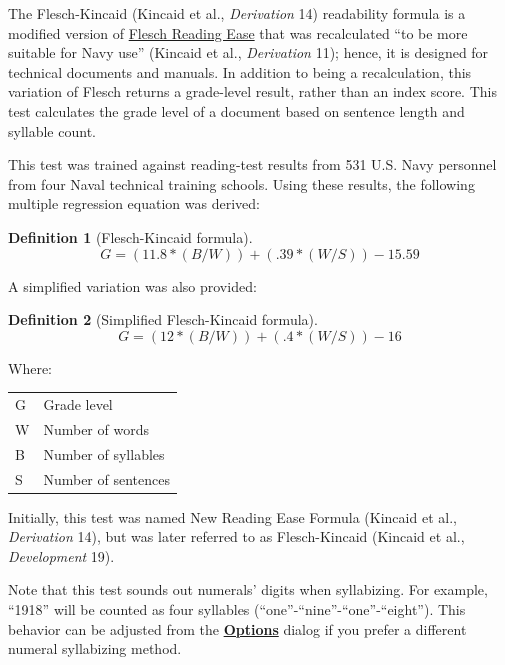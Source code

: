 \documentclass[
]{book}
\theoremstyle{definition}
\newtheorem{definition}{Definition}[chapter]
\theoremstyle{definition}
\theoremstyle{definition}
\theoremstyle{definition}
\theoremstyle{remark}
\begin{document}
The Flesch-Kincaid (Kincaid et al., \emph{Derivation} 14) readability formula is a modified version of \protect\hyperlink{flesch-test}{Flesch Reading Ease} that was recalculated ``to be more suitable for Navy use'' (Kincaid et al., \emph{Derivation} 11); hence, it is designed for technical documents and manuals. In addition to being a recalculation, this variation of Flesch returns a grade-level result, rather than an index score. This test calculates the grade level of a document based on sentence length and syllable count.

This test was trained against reading-test results from 531 U.S. Navy personnel from four Naval technical training schools. Using these results, the following multiple regression equation was derived:

\begin{definition}[Flesch-Kincaid formula]
\protect\hypertarget{def:fleschkincaid}{}{\label{def:fleschkincaid} {} }\[
G = (11.8*(B/W)) + (.39*(W/S)) - 15.59
\]
\end{definition}

A simplified variation was also provided:

\begin{definition}[Simplified Flesch-Kincaid formula]
\protect\hypertarget{def:fleschkincaidsimplified}{}{\label{def:fleschkincaidsimplified} {} }\[
G = (12*(B/W)) + (.4*(W/S)) - 16
\]
\end{definition}

Where:

\begin{longtable}[]{@{}
  >{\raggedright\arraybackslash}p{}
  >{\raggedright\arraybackslash}p{}@{}}
\toprule
\endhead
G & Grade level \\
W & Number of words \\
B & Number of syllables \\
S & Number of sentences \\
\bottomrule
\end{longtable}

Initially, this test was named New Reading Ease Formula (Kincaid et al., \emph{Derivation} 14), but was later referred to as Flesch-Kincaid (Kincaid et al., \emph{Development} 19).

Note that this test sounds out numerals' digits when syllabizing. For example, ``1918'' will be counted as four syllables (``one''-``nine''-``one''-``eight''). This behavior can be adjusted from the \protect\hyperlink{readability-test-options}{\textbf{Options}} dialog if you prefer a different numeral syllabizing method.
\end{document}
